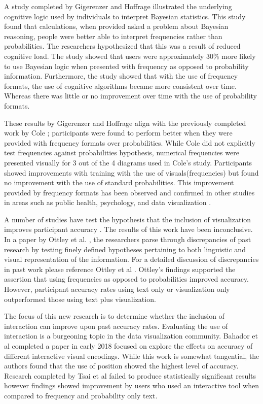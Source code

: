 A study completed by Gigerenzer and Hoffrage \cite{Gigerenzer1995} illustrated the
underlying cognitive logic used by individuals to interpret Bayesian
statistics. This study found that calculations, when provided asked a problem about Bayesian reasoning, people were better able to interpret frequencies rather than probabilities. The researchers
hypothesized that this was a result of reduced cognitive load. The study showed that users were
approximately 30\% more likely to use Bayesian logic when presented with
frequency as opposed to probability information. Furthermore, the study
showed that with the use of frequency formats, the use of cognitive
algorithms became more consistent over time. Whereas there was little or no
improvement over time with the use of probability formats.

These results by Gigerenzer and Hoffrage \cite{Gigerenzer1995} align with the
previously completed work by Cole \cite{Cole1989}; participants were found to
perform better when they were provided with frequency formats over
probabilities. While Cole did not explicitly test frequencies against
probabilities hypothesis, numerical frequencies were presented visually for 3
out of the 4 diagrams used in Cole’s study. Participants showed improvements
with training with the use of visuals(frequencies) but found no improvement
with the use of standard probabilities. This improvement provided by frequency formats has been observed and confirmed in other studies in areas such as public health, psychology, and data visualization \cite{Eddy1982, Galesic2009, Cohen2007, Brown2014, Brase2009}. 

A number of studies have test the hypothesis that the inclusion of
visualization improves participant accuracy \cite{Brown2014, Friederichs2014,
Cohen2007}. The results of this work have been inconclusive. In a paper by
Ottley et al. \cite{Ottley2016}, the researchers parse through discrepancies
of past research by testing finely defined hypotheses pertaining to both
linguistic and visual representation of the information. For a detailed
discussion of discrepancies in past work please reference Ottley et al \cite{Ottley2016}.
Ottley’s findings supported the assertion that using frequencies as opposed to
probabilities improved accuracy. However, participant accuracy rates using
text only or visualization only outperformed those using text plus
visualization.

The focus of this new research is to determine whether the inclusion of
interaction can improve upon past accuracy rates. Evaluating the use of
interaction is a burgeoning topic in the data visualization community.
Bahador et al completed a paper in early 2018 focused on explore the effects
on accuracy of different interactive visual encodings. While this work is
somewhat tangential, the authors found that the use of position showed the
highest level of accuracy. Research completed by Tsai et al \cite{Tsai2011} failed to
produce statistically significant results however findings showed improvement
by users who used an interactive tool when compared to frequency and
probability only text.




